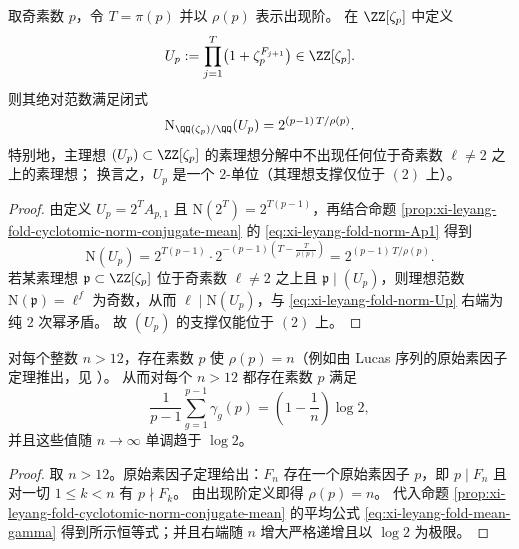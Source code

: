 \begin{corollary}\label{cor:xi-leyang-fold-pisano-block-2unit}
取奇素数 \(p\)，令 \(T=\pi(p)\) 并以 \(\rho(p)\) 表示出现阶。
在 \(\ZZ[\zeta_p]\) 中定义
\[
U_p:=\prod_{j=1}^{T}\bigl(1+\zeta_p^{F_{j+1}}\bigr)\in\ZZ[\zeta_p].
\]
则其绝对范数满足闭式
\begin{equation}\label{eq:xi-leyang-fold-norm-Up}
\mathrm N_{\QQ(\zeta_p)/\QQ}(U_p)=2^{(p-1)\,T/\rho(p)}.
\end{equation}
特别地，主理想 \((U_p)\subset\ZZ[\zeta_p]\) 的素理想分解中不出现任何位于奇素数 \(\ell\neq 2\) 之上的素理想；
换言之，\(U_p\) 是一个 \(2\)-单位（其理想支撑仅位于 \((2)\) 上）。
\end{corollary}
\begin{proof}
由定义 \(U_p=2^T A_{p,1}\) 且 \(\mathrm N(2^T)=2^{T(p-1)}\)，再结合命题 \ref{prop:xi-leyang-fold-cyclotomic-norm-conjugate-mean} 的 \eqref{eq:xi-leyang-fold-norm-Ap1} 得到
\[
\mathrm N(U_p)=2^{T(p-1)}\cdot 2^{-(p-1)\left(T-\frac{T}{\rho(p)}\right)}
=2^{(p-1)\,T/\rho(p)}.
\]
若某素理想 \(\mathfrak p\subset\ZZ[\zeta_p]\) 位于奇素数 \(\ell\neq 2\) 之上且 \(\mathfrak p\mid (U_p)\)，则理想范数 \(\mathrm N(\mathfrak p)=\ell^f\) 为奇数，从而 \(\ell\mid \mathrm N(U_p)\)，与 \eqref{eq:xi-leyang-fold-norm-Up} 右端为纯 \(2\) 次幂矛盾。
故 \((U_p)\) 的支撑仅能位于 \((2)\) 上。
\end{proof}

\begin{corollary}[由原始素因子定理导出的无穷共轭平均衰减平台]\label{cor:xi-leyang-fold-infinite-mean-gamma-platform}
对每个整数 \(n>12\)，存在素数 \(p\) 使 \(\rho(p)=n\)（例如由 Lucas 序列的原始素因子定理推出，见 \cite{BiluHanrotVoutier2001PrimitiveDivisorsLucas}）。
从而对每个 \(n>12\) 都存在素数 \(p\) 满足
\[
\frac{1}{p-1}\sum_{g=1}^{p-1}\gamma_g(p)=\left(1-\frac{1}{n}\right)\log 2,
\]
并且这些值随 \(n\to\infty\) 单调趋于 \(\log 2\)。
\end{corollary}
\begin{proof}
取 \(n>12\)。原始素因子定理给出：\(F_n\) 存在一个原始素因子 \(p\)，即 \(p\mid F_n\) 且对一切 \(1\le k<n\) 有 \(p\nmid F_k\)。
由出现阶定义即得 \(\rho(p)=n\)。
代入命题 \ref{prop:xi-leyang-fold-cyclotomic-norm-conjugate-mean} 的平均公式 \eqref{eq:xi-leyang-fold-mean-gamma} 得到所示恒等式；并且右端随 \(n\) 增大严格递增且以 \(\log 2\) 为极限。
\end{proof}

